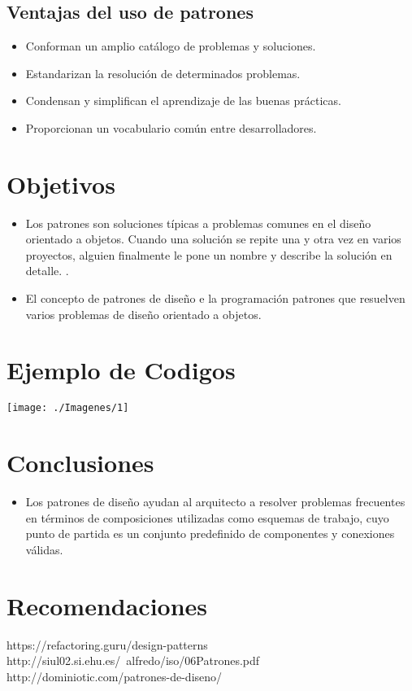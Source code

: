 \documentclass[twoside,twocolumn]{article}
\begin{document}
\subsection{Ventajas del uso de patrones}

\begin{itemize}
	\item Conforman un amplio catálogo de problemas y soluciones.
	\item Estandarizan la resolución de determinados problemas.
	\item Condensan y simplifican el aprendizaje de las buenas prácticas.
	\item Proporcionan un vocabulario común entre desarrolladores.
	
\end{itemize}

\section{Objetivos}

\begin{itemize}
\item  Los patrones son soluciones típicas a problemas comunes en el diseño orientado a objetos. Cuando una solución se repite una y otra vez en varios proyectos, alguien finalmente le pone un nombre y describe la solución en detalle. .
\item El concepto de patrones de diseño e la programación
patrones que resuelven varios problemas de diseño orientado a objetos.
\end{itemize}
\section{Ejemplo de Codigos}
\begin{center}
	\texttt{[image: ./Imagenes/1]} 
\end{center}



\section{Conclusiones}\label{sec:6}
\begin{itemize}
	\item Los patrones de diseño ayudan al arquitecto a resolver problemas frecuentes en términos de composiciones utilizadas como esquemas de trabajo, cuyo punto de partida es un conjunto predefinido de componentes y conexiones válidas.
\end{itemize}
\section{Recomendaciones}\label{sec:7}




https://refactoring.guru/design-patterns
http://siul02.si.ehu.es/~alfredo/iso/06Patrones.pdf
http://dominiotic.com/patrones-de-diseno/
\end{document}
